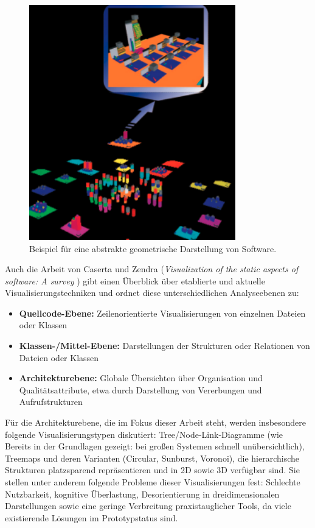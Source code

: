 \begin{figure}
    \centering
    \includegraphics[width=0.8\textwidth]{images/verwandte/geometrischeFiguren.png}
    \caption{Beispiel für eine abstrakte geometrische Darstellung von Software. \cite[7]{overview3D}}
    \label{fig:geometrischeFiguren}
\end{figure}

Auch die Arbeit von Caserta und Zendra (\textit{Visualization of the static aspects of software: A survey} \cite{staticSurvey}) gibt einen Überblick über etablierte und aktuelle Visualisierungstechniken und ordnet diese unterschiedlichen Analyseebenen zu:
\begin{itemize}
\item \textbf{Quellcode-Ebene:} Zeilenorientierte Visualisierungen von einzelnen Dateien oder Klassen
\item \textbf{Klassen-/Mittel-Ebene:} Darstellungen der Strukturen oder Relationen von Dateien oder Klassen
\item \textbf{Architekturebene:} Globale Übersichten über Organisation und Qualitätsattribute, etwa durch Darstellung von Vererbungen und Aufrufstrukturen
\end{itemize}
Für die Architekturebene, die im Fokus dieser Arbeit steht, werden insbesondere folgende Visualisierungstypen diskutiert: Tree/Node-Link-Diagramme (wie Bereits in der Grundlagen gezeigt: bei großen Systemen schnell unübersichtlich), Treemaps und deren Varianten (Circular, Sunburst, Voronoi), die hierarchische Strukturen platzsparend repräsentieren und in 2D sowie 3D verfügbar sind. Sie stellen unter anderem folgende Probleme dieser Visualisierungen fest: Schlechte Nutzbarkeit, kognitive Überlastung, Desorientierung in dreidimensionalen Darstellungen sowie eine geringe Verbreitung praxistauglicher Tools, da viele existierende Lösungen im Prototypstatus sind.

